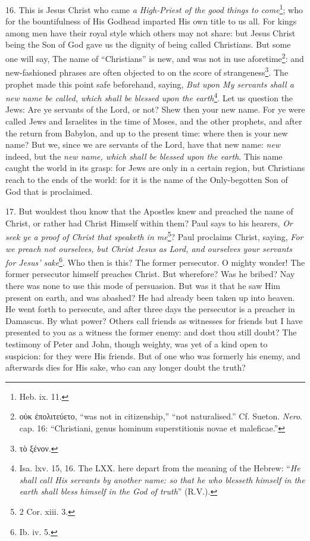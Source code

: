 16. This is Jesus Christ who came \emph{a High-Priest of the good things to come}\footnote{Heb. ix. 11.}; who for the bountifulness of His Godhead imparted His own title to us all. For kings among men have their royal style which others may not share: but Jesus Christ being the Son of God gave us the dignity of being called Christians. But some one will say, The name of “Christians” is new, and was not in use aforetime\footnote{\textgreek{οὐκ ἐπολιτεύετο}, “was not in citizenship,” “not naturalised.” Cf. Sueton. \emph{Nero}. cap. 16: “Christiani, genus hominum superstitionis novae et maleficae.”}: and new-fashioned phrases are often objected to on the score of strangeness\footnote{\textgreek{τὸ ξένον}.}. The prophet made this point safe beforehand, saying, \emph{But upon My servants shall a new name be called, which shall be blessed upon the earth}\footnote{Isa. lxv. 15, 16. The LXX. here depart from the meaning of the Hebrew: “\emph{He shall call His servants by another name: so that he who blesseth himself in the earth shall bless himself in the God of truth}” (R.V.).}. Let us question the Jews: Are ye servants of the Lord, or not? Shew then your new name. For ye were called Jews and Israelites in the time of Moses, and the other prophets, and after the return from Babylon, and up to the present time: where then is your new name? But we, since we are servants of the Lord, have that new name: \emph{new} indeed, but the \emph{new name, which shall be blessed upon the earth}. This name caught the world in its grasp: for Jews are only in a certain region, but Christians reach to the ends of the world: for it is the name of the Only-begotten Son of God that is proclaimed.

17. But wouldest thou know that the Apostles knew and preached the name of Christ, or rather had Christ Himself within them? Paul says to his hearers, \emph{Or seek ye a proof of Christ that speaketh in me}\footnote{2 Cor. xiii. 3.}? Paul proclaims Christ, saying, \emph{For we preach not ourselves, but Christ Jesus as Lord, and ourselves your servants for Jesus’ sake}\footnote{Ib. iv. 5.}. Who then is this? The former persecutor. O mighty wonder! The former persecutor himself preaches Christ. But wherefore? Was he bribed? Nay there was none to use this mode of persuasion. But was it that he saw Him present on earth, and was abashed? He had already been taken up into heaven. He went forth to persecute, and after three days the persecutor is a preacher in Damascus. By what power? Others call friends as witnesses for friends but I have presented to you as a witness the former enemy: and dost thou still doubt? The testimony of Peter and John, though weighty, was yet of a kind open to suspicion: for they were His friends. But of one who was formerly his enemy, and afterwards dies for His sake, who can any longer doubt the truth?

